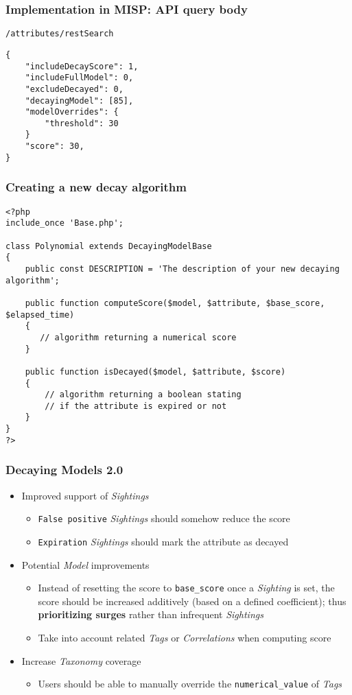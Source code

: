\begin{frame}[fragile]
    \frametitle{Implementation in MISP: API query body}
    \texttt{/attributes/restSearch}
    \begin{lstlisting}
{
    "includeDecayScore": 1,
    "includeFullModel": 0,
    "excludeDecayed": 0,
    "decayingModel": [85],
    "modelOverrides": {
        "threshold": 30
    }
    "score": 30,
}
    \end{lstlisting}
\end{frame}

\lstset{language=PHP}
\begin{frame}[fragile]
    \frametitle{Creating a new decay algorithm}
    \lstset{basicstyle=\scriptsize}
    \begin{lstlisting}
<?php
include_once 'Base.php';

class Polynomial extends DecayingModelBase
{
    public const DESCRIPTION = 'The description of your new decaying algorithm';

    public function computeScore($model, $attribute, $base_score, $elapsed_time)
    {
       // algorithm returning a numerical score
    }

    public function isDecayed($model, $attribute, $score)
    {
        // algorithm returning a boolean stating
        // if the attribute is expired or not
    }
}
?>
    \end{lstlisting}
\end{frame}

\begin{frame}
    \frametitle{Decaying Models 2.0}
    \begin{itemize}
        \item Improved support of \textit{Sightings}
        \begin{itemize}
            \item \texttt{False positive} \textit{Sightings} should somehow reduce the score
            \item \texttt{Expiration} \textit{Sightings} should mark the attribute as decayed
        \end{itemize}
        \item Potential \textit{Model} improvements
        \begin{itemize}
            \item Instead of resetting the score to \texttt{base\_score} once a \textit{Sighting} is set, the score should be increased additively (based on a defined coefficient); thus \textbf{prioritizing surges} rather than infrequent \textit{Sightings}
            \item Take into account related \textit{Tags} or \textit{Correlations} when computing score
        \end{itemize}
        \item Increase \textit{Taxonomy} coverage
        \begin{itemize}
            \item Users should be able to manually override the \texttt{numerical\_value} of \textit{Tags}
        \end{itemize}
    \end{itemize}
\end{frame}
